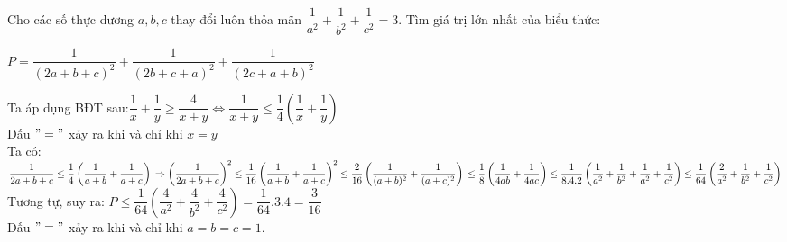 \begin{ex}%
    Cho các số thực dương $a,b,c$ thay đổi luôn thỏa mãn $\dfrac{1}{a^2}+\dfrac{1}{b^2}+\dfrac{1}{c^2}=3$. Tìm giá trị lớn nhất của biểu thức:
    \begin{center}
    $P=\dfrac{1}{(2a+b+c)^2}+\dfrac{1}{(2b+c+a)^2}+\dfrac{1}{(2c+a+b)^2}$
    \end{center}
\loigiai
    {Ta áp dụng BĐT sau:$\dfrac{1}{x}+\dfrac{1}{y} \geq \dfrac{4}{x+y} \Leftrightarrow \dfrac{1}{x+y} \leq \dfrac{1}{4}\left(\dfrac{1}{x}+\dfrac{1}{y}\right)$\\
    Dấu $"="$ xảy ra khi và chỉ khi $x=y$\\
    Ta có: $\dfrac{1}{2a+b+c} \leq \dfrac{1}{4} \left(\dfrac{1}{a+b}+\dfrac{1}{a+c}\right) \\
    \Rightarrow \left ( \dfrac{1}{2a+b+c} \right )^2 \leq \dfrac{1}{16}\left(\dfrac{1}{a+b}+\dfrac{1}{a+c}\right)^2 \leq \dfrac{2}{16}\left( \dfrac{1}{(a+b)^2}+\dfrac{1}{(a+c)^2}\right)\\
     \leq \dfrac{1}{8}\left( \dfrac{1}{4ab}+\dfrac{1}{4ac}\right) \leq \dfrac{1}{8.4.2}\left( \dfrac{1}{a^2}+\dfrac{1}{b^2}+\dfrac{1}{a^2}+\dfrac{1}{c^2}\right) \leq \dfrac{1}{64}\left( \dfrac{2}{a^2}+\dfrac{1}{b^2}+\dfrac{1}{c^2}\right)$\\
     Tương tự, suy ra: $P \leq \dfrac{1}{64}\left( \dfrac{4}{a^2}+\dfrac{4}{b^2}+\dfrac{4}{c^2}\right)=\dfrac{1}{64}.3.4=\dfrac{3}{16}$\\
     Dấu $"="$ xảy ra khi và chỉ khi $a=b=c=1$.
    }
\end{ex}

